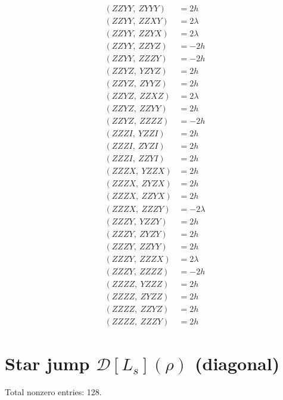\documentclass{article}
\begin{document}
\begin{align*}
  (ZZYY,\ ZYYY) &= 2 h \\
  (ZZYY,\ ZZXY) &= 2 \lambda \\
  (ZZYY,\ ZZYX) &= 2 \lambda \\
  (ZZYY,\ ZZYZ) &= - 2 h \\
  (ZZYY,\ ZZZY) &= - 2 h \\
  (ZZYZ,\ YZYZ) &= 2 h \\
  (ZZYZ,\ ZYYZ) &= 2 h \\
  (ZZYZ,\ ZZXZ) &= 2 \lambda \\
  (ZZYZ,\ ZZYY) &= 2 h \\
  (ZZYZ,\ ZZZZ) &= - 2 h \\
  (ZZZI,\ YZZI) &= 2 h \\
  (ZZZI,\ ZYZI) &= 2 h \\
  (ZZZI,\ ZZYI) &= 2 h \\
  (ZZZX,\ YZZX) &= 2 h \\
  (ZZZX,\ ZYZX) &= 2 h \\
  (ZZZX,\ ZZYX) &= 2 h \\
  (ZZZX,\ ZZZY) &= - 2 \lambda \\
  (ZZZY,\ YZZY) &= 2 h \\
  (ZZZY,\ ZYZY) &= 2 h \\
  (ZZZY,\ ZZYY) &= 2 h \\
  (ZZZY,\ ZZZX) &= 2 \lambda \\
  (ZZZY,\ ZZZZ) &= - 2 h \\
  (ZZZZ,\ YZZZ) &= 2 h \\
  (ZZZZ,\ ZYZZ) &= 2 h \\
  (ZZZZ,\ ZZYZ) &= 2 h \\
  (ZZZZ,\ ZZZY) &= 2 h
\end{align*}
\section*{Star jump $\mathcal{D}[L_s](\rho)$ (diagonal)}
Total nonzero entries: 128.
\end{document}
